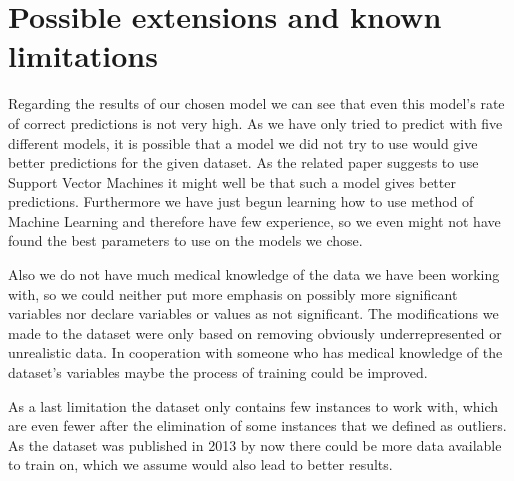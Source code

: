 \section{Possible extensions and known limitations}\label{sec-ext}
Regarding the results of our chosen model we can see that even this model's rate of correct predictions is not very high. As we have only tried to predict with five different models, it is possible that a model we did not try to use would give better predictions for the given dataset. As the related paper suggests to use Support Vector Machines it might well be that such a model gives better predictions. Furthermore we have just begun learning how to use method of Machine Learning and therefore have few experience, so we even might not have found the best parameters to use on the models we chose.

Also we do not have much medical knowledge of the data we have been working with, so we could neither put more emphasis on possibly more significant variables nor declare variables or values as not significant. The modifications we made to the dataset were only based on removing obviously underrepresented or unrealistic data. In cooperation with someone who has medical knowledge of the dataset's variables maybe the process of training could be improved.

As a last limitation the dataset only contains few instances to work with, which are even fewer after the elimination of some instances that we defined as outliers. As the dataset was published in 2013 by now there could be more data available to train on, which we assume would also lead to better results.

